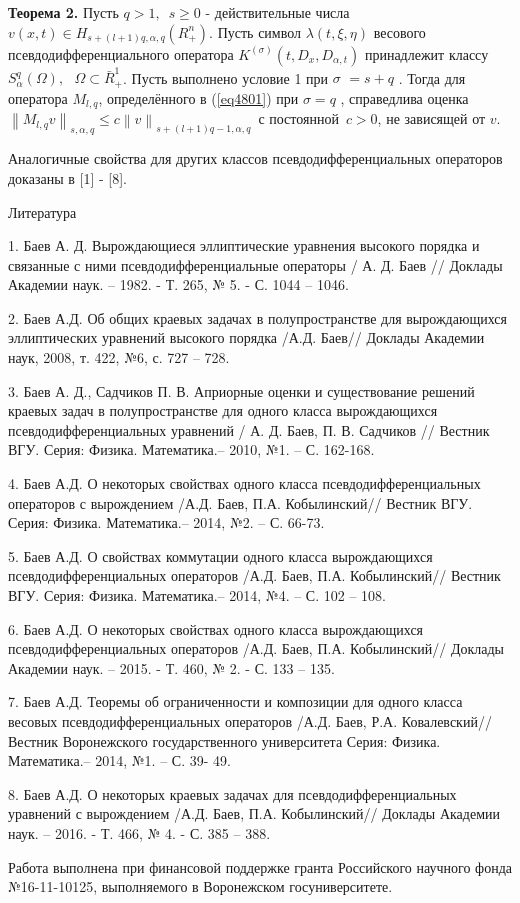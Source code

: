 {\textbf{Теорема 2.} Пусть $q > 1,\,\,\,s \ge 0$ - действительные числа
$v(x,t) \in H_{s + (l + 1)q,\alpha ,q} (R_ + ^n )$. Пусть символ $\lambda
(t,\xi ,\eta )$ весового псевдодифференциального оператора $K^{(\sigma
)}(t,D_x ,D_{\alpha ,t} )$ принадлежит классу $S_\alpha ^q (\Omega
),\,\,\,\,\Omega \subset \bar {R}_ + ^1 $. Пусть выполнено условие 1 при
$\sigma \,\, = s + q\,\,$. Тогда для оператора $M_{l,q} $, определённого в
(\ref{eq4801}) при $\sigma = q\,\,$, справедлива оценка $\left\| {M_{l,q} v}
\right\|_{s,\alpha ,q} \le c\left\| v \right\|_{s + (l + 1)q - 1,\alpha ,q}
\,$
с постоянной $\,c > 0$, не зависящей от $v$.



Аналогичные свойства для других классов псевдодифференциальных операторов
доказаны в [1] - [8].

\begin{center}
Литература
\end{center}

1. Баев А. Д. Вырождающиеся эллиптические уравнения высокого порядка и
связанные с ними псевдодифференциальные операторы / А. Д. Баев // Доклады
Академии наук. -- 1982. - Т. 265, № 5. - С. 1044 -- 1046.

2. Баев А.Д. Об общих краевых задачах в полупространстве для вырождающихся
эллиптических уравнений высокого порядка /А.Д. Баев// Доклады Академии наук,
2008, т. 422, №6, с. 727 -- 728.

3. Баев А. Д., Садчиков П. В. Априорные оценки и существование решений
краевых задач в полупространстве для одного класса вырождающихся
псевдодифференциальных уравнений / А. Д. Баев, П. В. Садчиков // Вестник
ВГУ. Серия: Физика. Математика.-- 2010, №1. -- С. 162-168.

4. Баев А.Д. О некоторых свойствах одного класса псевдодифференциальных
операторов с вырождением /А.Д. Баев, П.А. Кобылинский// Вестник ВГУ. Серия:
Физика. Математика.-- 2014, №2. -- С. 66-73.

5. Баев А.Д. О свойствах коммутации одного класса вырождающихся
псевдодифференциальных операторов /А.Д. Баев, П.А. Кобылинский// Вестник
ВГУ. Серия: Физика. Математика.-- 2014, №4. -- С. 102 -- 108.

6. Баев А.Д. О некоторых свойствах одного класса вырождающихся
псевдодифференциальных операторов /А.Д. Баев, П.А. Кобылинский// Доклады
Академии наук. -- 2015. - Т. 460, № 2. - С. 133 -- 135.

7. Баев А.Д. Теоремы об ограниченности и композиции для одного класса
весовых псевдодифференциальных операторов /А.Д. Баев, Р.А. Ковалевский//
Вестник Воронежского государственного университета Серия: Физика.
Математика.-- 2014, №1. -- С. 39- 49.

8. Баев А.Д. О некоторых краевых задачах для псевдодифференциальных
уравнений с вырождением /А.Д. Баев, П.А. Кобылинский// Доклады Академии
наук. -- 2016. - Т. 466, № 4. - С. 385 -- 388.





Работа выполнена при финансовой поддержке гранта Российского научного фонда
№16-11-10125, выполняемого в Воронежском госуниверситете.

}
